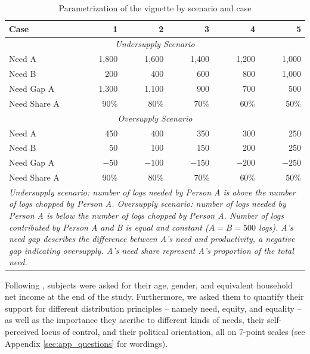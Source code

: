 \documentclass[egregdoesnotlikesansseriftitles]{scrartcl}
\begin{document}
\begin{table}[ht]
   \centering
   \caption{Parametrization of the vignette by scenario and case}\label{tab:cases}
   \begin{tabular}{lrrrrr}\\[0.5ex]\hline
      Case                    & 1        & 2        & 3        & 4        & 5        \\\hline\hline
      \multicolumn{6}{c}{\textit{Undersupply Scenario}}                              \\
      Need A                  & 1,800    & 1,600    & 1,400    & 1,200    & 1,000    \\
      Need B                  &   200    &   400    &   600    &   800    & 1,000    \\
      Need Gap A              & 1,300    & 1,100    &   900    &   700    &   500    \\
      Need Share A            & 90\%     & 80\%     & 70\%     & 60\%     & 50\%     \\\hline
      \multicolumn{6}{c}{\textit{Oversupply Scenario}}                               \\
      Need A                  &   450    &   400    &   350    &   300    &   250    \\
      Need B                  &    50    &   100    &   150    &   200    &   250    \\
      Need Gap A              &  $-50$   & $-100$   & $-150$   & $-200$   & $-250$   \\
      Need Share A            & 90\%     & 80\%     & 70\%     & 60\%     & 50\%     \\\hline
      \multicolumn{6}{p{9cm}}{\footnotesize{\textit{Undersupply scenario: number of logs needed by Person A is above the number of logs chopped by Person A. Oversupply scenario: number of logs needed by Person A is below the number of logs chopped by Person A. Number of logs contributed by Person A and B is equal and constant ($A=B=500$ logs). A's need gap describes the difference between A's need and productivity, a negative gap indicating oversupply. A's need share represent A's proportion of the total need.}}}
   \end{tabular}
\end{table}

Following \cite{bauer_need_2022}, subjects were asked for their age, gender, and equivalent household net income at the end of the study.
Furthermore, we asked them to quantify their support for different distribution principles -- namely need, equity, and equality -- as well as the importance they ascribe to different kinds of needs, their self-perceived locus of control, and their political orientation, all on 7-point scales (see Appendix \ref{sec:app_questions} for wordings).
\end{document}
